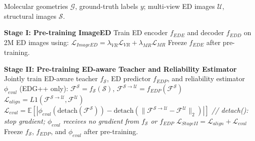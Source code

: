 \begin{algorithm}[!htb]
   \caption{The overall process of EDG/EDG++ framework.}
   \label{alg:edg_process}
\begin{algorithmic}
    Molecular geometries $\mathcal{G}$, ground-truth labels $y$; multi-view ED images $\mathcal{U}$, structural images $\mathcal{S}$.

   \STATE
   \STATE \textbf{Stage I: Pre-training ImageED}
   \STATE Train ED encoder $f_{EDE}$ and decoder $f_{EDD}$ on 2M ED images using:
   \STATE \quad $\mathcal{L}_{ImageED} = \lambda_{VR}\mathcal{L}_{VR} + \lambda_{MR}\mathcal{L}_{MR}$
   \STATE Freeze $f_{EDE}$ after pre-training.

   \STATE
   \STATE \textbf{Stage II: Pre-training ED-aware Teacher and Reliability Estimator}
   \STATE Jointly train ED-aware teacher $f_{\mathcal{S}}$, ED predictor $f_{EDP}$, and reliability estimator $\phi_{eval}$ (EDG++ only):
   \STATE \quad $\mathcal{F}^{\mathcal{S}} = f_{\mathcal{S}}(\mathcal{S})$, $\mathcal{F}^{\mathcal{S}\rightarrow\mathcal{U}} = f_{EDP}(\mathcal{F}^{\mathcal{S}})$
   \STATE \quad $\mathcal{L}_{align} = L1(\mathcal{F}^{\mathcal{S}\rightarrow\mathcal{U}}, \mathcal{F}^{\mathcal{U}})$
   \STATE \quad $\mathcal{L}_{eval} = \mathbb{E}\!\left[\left|\phi_{eval}(\text{detach}(\mathcal{F}^{\mathcal{S}})) - \text{detach}(\|\mathcal{F}^{\mathcal{S}\!\rightarrow\!\mathcal{U}} - \mathcal{F}^{\mathcal{U}}\|_2)\right|\right]$
   \STATE \quad \textit{// detach(): stop gradient; $\phi_{eval}$ receives no gradient from $f_{\mathcal{S}}$ or $f_{EDP}$}
   \STATE \quad $\mathcal{L}_{Stage II} = \mathcal{L}_{align} + \mathcal{L}_{eval}$
   \STATE Freeze $f_{\mathcal{S}}$, $f_{EDP}$, and $\phi_{eval}$ after pre-training.


\end{algorithmic}
\end{algorithm}

